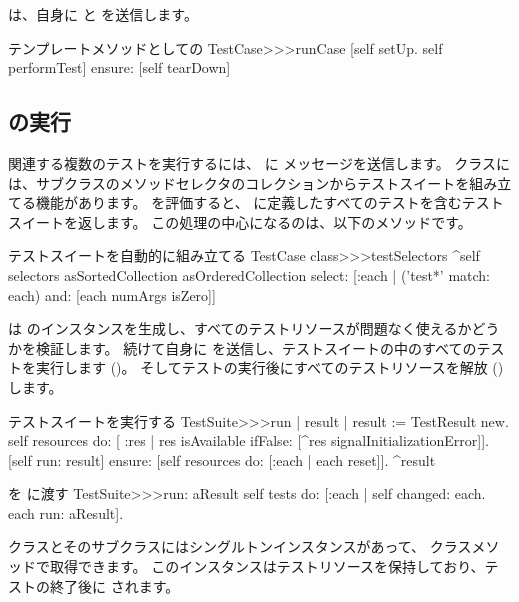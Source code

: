 \documentclass[a4paper,10pt,twoside]{book}
\begin{document}
 は、自身に  と  を送信します。
\begin{method}[testcaseruncase]{テンプレートメソッドとしての \protect\footnotemark}
TestCase>>>runCase
	[self setUp.
	self performTest] ensure: [self tearDown]
\end{method}

\subsection{ の実行}

関連する複数のテストを実行するには、 に  メッセージを送信します。
 クラスには、サブクラスのメソッドセレクタのコレクションからテストスイートを組み立てる機能があります。
 を評価すると、 に定義したすべてのテストを含むテストスイートを返します。
この処理の中心になるのは、以下のメソッドです。
\begin{method}[testcasetestselectors]{テストスイートを自動的に組み立てる}
TestCase class>>>testSelectors 
	^self selectors asSortedCollection asOrderedCollection select: [:each | 
		('test*' match: each) and: [each numArgs isZero]]
\end{method}

 は  のインスタンスを生成し、すべてのテストリソースが問題なく使えるかどうかを検証します。
続けて自身に  を送信し、テストスイートの中のすべてのテストを実行します ()。
そしてテストの実行後にすべてのテストリソースを解放 () します。
\begin{method}[testsuiterun]{テストスイートを実行する}
TestSuite>>>run
	| result |
 	result := TestResult new.
	self resources do: [ :res |
		res isAvailable ifFalse: [^res signalInitializationError]].
	[self run: result] ensure: [self resources do: [:each | each reset]].
	^result
\end{method}

\begin{method}[testsuiterun:]{ を  に渡す}
TestSuite>>>run: aResult
	self tests do: [:each | 
		self changed: each.
		each run: aResult].
\end{method}
 クラスとそのサブクラスにはシングルトンインスタンスがあって、 クラスメソッドで取得できます。
このインスタンスはテストリソースを保持しており、テストの終了後に  されます。
\end{document}
